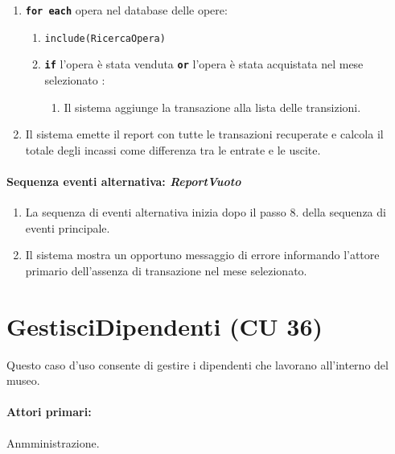 \documentclass{article}
\begin{document}
\begin{enumerate}[itemsep=8pt,parsep=0pt]
		\item \texttt{\textbf{for each}} opera nel database delle opere:
		    \begin{enumerate}	[leftmargin=28pt]
				\item \texttt{{include(RicercaOpera)}}
				\item \texttt{\textbf{if}} l'opera è stata venduta \texttt{\textbf{or}} l'opera è stata acquistata nel mese selezionato :
					\begin{enumerate}	[leftmargin=28pt]
						\item Il sistema aggiunge la transazione alla lista delle transizioni.
		  			\end{enumerate}	
  		    \end{enumerate}

		\item Il sistema emette il report con tutte le transazioni recuperate e calcola il totale degli incassi come differenza tra le entrate e le uscite.

	\end{enumerate}
	
		\paragraph{Sequenza eventi alternativa: \textit{ReportVuoto}}
	\begin{enumerate}	[leftmargin=28pt]
			\item  La sequenza di eventi alternativa inizia dopo il passo 8. della sequenza di eventi principale.
			\item  Il sistema mostra un opportuno messaggio di errore informando l'attore primario dell'assenza di transazione nel mese selezionato.
		\end{enumerate}













\newpage 
	
	\section*{GestisciDipendenti (CU 36)}
	
	\indent\indent Questo caso d'uso consente di gestire i dipendenti che lavorano all'interno del museo.
	
	\paragraph{Attori primari:}Anmministrazione.
	
\end{document}
